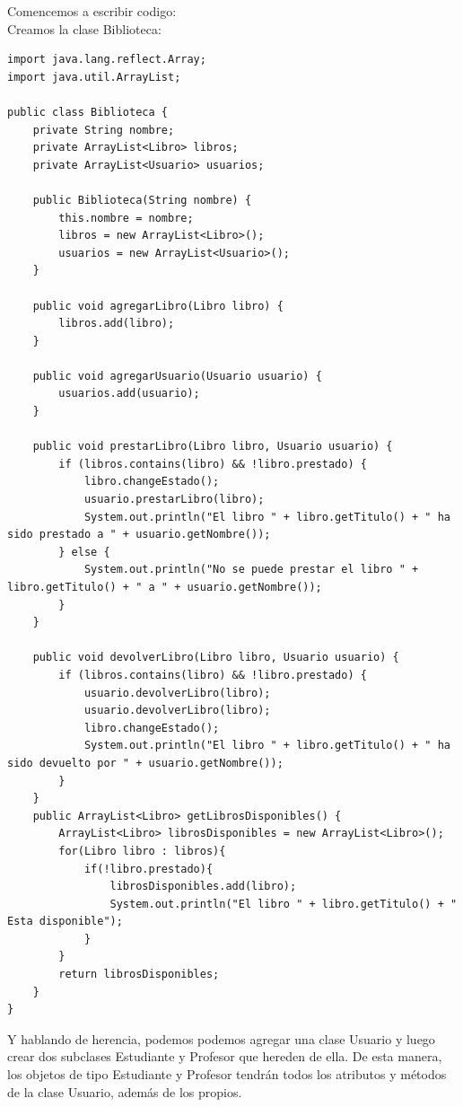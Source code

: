 \documentclass[executivepaper]{article}
\begin{document}
Comencemos a escribir codigo:\\ 
Creamos la clase Biblioteca:
\begin{lstlisting}
import java.lang.reflect.Array;
import java.util.ArrayList;

public class Biblioteca {
    private String nombre;
    private ArrayList<Libro> libros;
    private ArrayList<Usuario> usuarios;

    public Biblioteca(String nombre) {
        this.nombre = nombre;
        libros = new ArrayList<Libro>();
        usuarios = new ArrayList<Usuario>();
    }

    public void agregarLibro(Libro libro) {
        libros.add(libro);
    }

    public void agregarUsuario(Usuario usuario) {
        usuarios.add(usuario);
    }

    public void prestarLibro(Libro libro, Usuario usuario) {
        if (libros.contains(libro) && !libro.prestado) {
            libro.changeEstado();
            usuario.prestarLibro(libro);
            System.out.println("El libro " + libro.getTitulo() + " ha sido prestado a " + usuario.getNombre());
        } else {
            System.out.println("No se puede prestar el libro " + libro.getTitulo() + " a " + usuario.getNombre());
        }
    }

    public void devolverLibro(Libro libro, Usuario usuario) {
        if (libros.contains(libro) && !libro.prestado) {
            usuario.devolverLibro(libro);
            usuario.devolverLibro(libro);
            libro.changeEstado();
            System.out.println("El libro " + libro.getTitulo() + " ha sido devuelto por " + usuario.getNombre());
        }
    }
    public ArrayList<Libro> getLibrosDisponibles() {
        ArrayList<Libro> librosDisponibles = new ArrayList<Libro>();
        for(Libro libro : libros){
            if(!libro.prestado){
                librosDisponibles.add(libro);
                System.out.println("El libro " + libro.getTitulo() + " Esta disponible");
            }
        }
        return librosDisponibles;
    }
}
\end{lstlisting}
Y hablando de herencia, podemos podemos agregar una clase Usuario y luego crear dos subclases Estudiante y Profesor que hereden de ella. De esta manera, los objetos de tipo Estudiante y Profesor tendrán todos los atributos y métodos de la clase Usuario, además de los propios.
\end{document}
